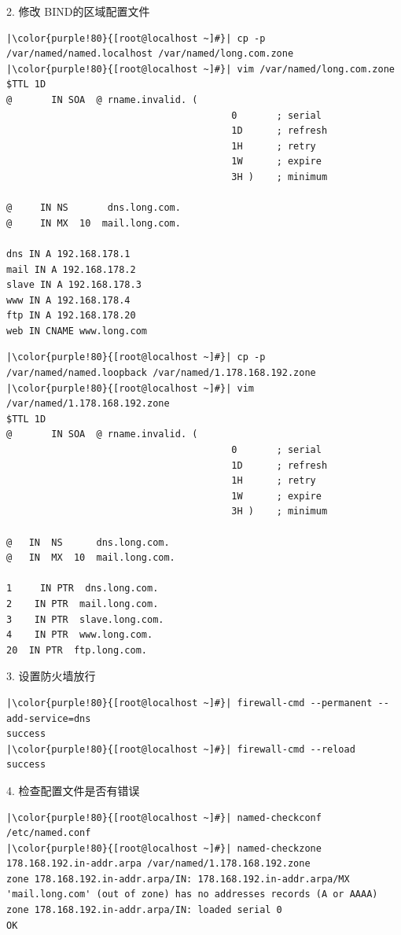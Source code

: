 \begin{ascboxB}{2.  修改 BIND的区域配置文件}
\quad {}
\begin{verbatim}
|\color{purple!80}{[root@localhost ~]#}| cp -p /var/named/named.localhost /var/named/long.com.zone
|\color{purple!80}{[root@localhost ~]#}| vim /var/named/long.com.zone
$TTL 1D
@       IN SOA  @ rname.invalid. (
                                        0       ; serial
                                        1D      ; refresh
                                        1H      ; retry
                                        1W      ; expire
                                        3H )    ; minimum

@     IN NS       dns.long.com.
@     IN MX  10  mail.long.com.

dns IN A 192.168.178.1
mail IN A 192.168.178.2
slave IN A 192.168.178.3
www IN A 192.168.178.4
ftp IN A 192.168.178.20
web IN CNAME www.long.com
\end{verbatim}
\quad {}
\begin{verbatim}
|\color{purple!80}{[root@localhost ~]#}| cp -p /var/named/named.loopback /var/named/1.178.168.192.zone
|\color{purple!80}{[root@localhost ~]#}| vim /var/named/1.178.168.192.zone
$TTL 1D
@       IN SOA  @ rname.invalid. (
                                        0       ; serial
                                        1D      ; refresh
                                        1H      ; retry
                                        1W      ; expire
                                        3H )    ; minimum

@   IN  NS      dns.long.com.
@   IN  MX  10  mail.long.com.

1     IN PTR  dns.long.com.
2    IN PTR  mail.long.com.
3    IN PTR  slave.long.com.
4    IN PTR  www.long.com.
20  IN PTR  ftp.long.com.
\end{verbatim}
\end{ascboxB}
\begin{ascboxB}{3. 设置防火墙放行}
\begin{verbatim}
|\color{purple!80}{[root@localhost ~]#}| firewall-cmd --permanent --add-service=dns 
success
|\color{purple!80}{[root@localhost ~]#}| firewall-cmd --reload
success
\end{verbatim}
\end{ascboxB}
\begin{ascboxB}{4. 检查配置文件是否有错误}
\begin{verbatim}
|\color{purple!80}{[root@localhost ~]#}| named-checkconf /etc/named.conf
|\color{purple!80}{[root@localhost ~]#}| named-checkzone 178.168.192.in-addr.arpa /var/named/1.178.168.192.zone
zone 178.168.192.in-addr.arpa/IN: 178.168.192.in-addr.arpa/MX 'mail.long.com' (out of zone) has no addresses records (A or AAAA)
zone 178.168.192.in-addr.arpa/IN: loaded serial 0
OK
\end{verbatim}
\end{ascboxB}

